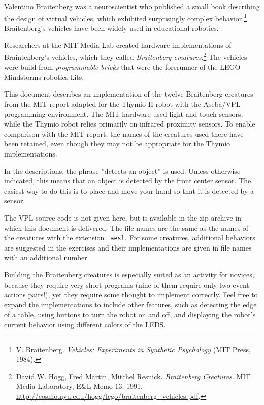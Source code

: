 \documentclass[12pt,a4paper,english]{report}
\begin{document}
\href{http://en.wikipedia.org/wiki/Valentino_Braitenberg}{Valentino
Braitenberg} was a neuroscientist who published a small book describing
the design of virtual vehicles, which exhibited surprisingly complex
behavior.\footnote{V. Braitenberg. \textit{Vehicles: Experiments in
Synthetic Psychology} (MIT Press, 1984).} Braitenberg's vehicles have
been widely used in educational robotics.

Researchers at the MIT Media Lab created hardware implementations of
Braintenberg's vehicles, which they called \emph{Braitenberg
creatures}.\footnote{David W. Hogg, Fred Martin, Mitchel Resnick.
\textit{Braitenberg Creatures}. MIT Media Laboratory, E\&L Memo 13,
1991. \url{http://cosmo.nyu.edu/hogg/lego/braitenberg_vehicles.pdf}.}
The vehicles were build from \emph{programmable bricks} that were the
forerunner of the LEGO Mindstorms robotics kits.

This document describes an implementation of the twelve Braitenberg
creatures from the MIT report adapted for the Thymio-II robot with the
Aseba/\textsc{VPL} programming environment. The MIT hardware used light
and touch sensors, while the Thymio robot relies primarily on
infrared proximity sensors. To enable comparison with the MIT report,
the names of the creatures used there have been retained, even though
they may not be appropriate for the Thymio implementations.

In the descriptions, the phrase ''detects an object'' is used. Unless
otherwise indicated, this means that an object is detected by the front
center sensor. The easiest way to do this is to place and move your hand
so that it is detected by a sensor.

The \textsc{VPL} source code is not given here, but is available in the
zip archive in which this document is delivered. The file names are the
same as the names of the creatures with the extension \texttt{\small
aesl}. For some creatures, additional behaviors are suggested in the
exercises and their implementations are given in file names with an
additional number.

Building the Braitenberg creatures is especially suited as an activity
for novices, because they require very short programs (nine of them
require only two event-actions pairs!), yet they require some thought to
implement correctly. Feel free to expand the implementations to include
other features, such as detecting the edge of a table, using buttons to
turn the robot on and off, and displaying the robot's current behavior
using different colors of the LEDS.
\end{document}
